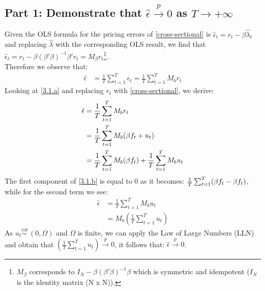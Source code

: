 \documentclass[12pt]{article}
\begin{document}
	\subsection{Part 1: Demonstrate that $\hat{\epsilon} \overset{p}{\to} 0$ as $T\to{+\infty}$ }
	Given the OLS formula for the pricing errors of \ref{cross-sectional} is $\hat{\epsilon}_t = r_t - \beta\hat{\lambda}_t$ and replacing $\hat{\lambda}$ with the corresponding OLS result, we find that $\hat{\epsilon}_t = r_t - \beta(\beta'\beta)^{-1}\beta'r_t = M_{\beta}r_t$\footnote{$M_{\beta}$ corresponds to $I_N - \beta(\beta'\beta)^{-1}\beta$ which is symmetric and idempotent ($I_N$ is the identity matrix (N x N)).}.\\
	Therefore we observe that:
	\begin{align} \label{3.1.a}
				\hat{\epsilon} &= \frac{1}{T}\sum_{t=1}^{T}\epsilon_t = \frac{1}{T}\sum_{t=1}^{T}M_br_t
	\end{align}
	Looking at \ref{3.1.a} and replacing $r_t$ with \ref{cross-sectional}, we derive:
\begin{align} \label{3.1.b}
				\hat{\epsilon} &=\frac{1}{T}\sum_{t=1}^{T}M_br_t \notag \\ \notag
				&= \frac{1}{T}\sum_{t=1}^{T}M_b(\MakeUppercase\beta f_t + u_t) \\ 
				&= \frac{1}{T}\sum_{t=1}^{T}M_b(\MakeUppercase\beta f_t) + \frac{1}{T}\sum_{t=1}^{T}M_bu_t
\end{align}
The first component of \ref{3.1.b} is equal to 0 as it becomes: $\frac{1}{T}\sum_{t=1}^{T}(\MakeUppercase\beta f_t-\MakeUppercase\beta f_t)$, while for the second term we see:
\begin{align*} 
				\hat{\epsilon} &=\frac{1}{T}\sum_{t=1}^{T}M_bu_t \\
				&= M_b(\frac{1}{T}\sum_{t=1}^{T}u_t)
\end{align*}
As $u_t \overset{iid}{\sim} \: (0,\Omega)$ and $\Omega$ is finite, we can apply the Law of Large Numbers (LLN) and obtain that $(\frac{1}{T}\sum_{t=1}^{T}u_t) \overset{p}{\to} 0$, it follows that: $\hat{\epsilon} \overset{p}{\to} 0$.
\end{document}
